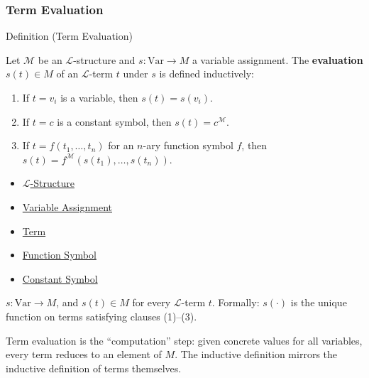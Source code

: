 
\subsubsection*{Term Evaluation}

\begin{definitionbox}{Definition (Term Evaluation)}
\begin{definition}\label{def:term-evaluation}
Let $\mathcal{M}$ be an $\mathcal{L}$-structure and $s : \mathrm{Var} \to M$
a variable assignment.
The \textbf{evaluation} $s(t) \in M$ of an $\mathcal{L}$-term $t$ under
$s$ is defined inductively:
\begin{enumerate}
  \item If $t = v_i$ is a variable, then $s(t) = s(v_i)$.
  \item If $t = c$ is a constant symbol, then $s(t) = c^{\mathcal{M}}$.
  \item If $t = f(t_1, \ldots, t_n)$ for an $n$-ary function symbol $f$,
        then $s(t) = f^{\mathcal{M}}(s(t_1), \ldots, s(t_n))$.
\end{enumerate}
\end{definition}
\end{definitionbox}

\begin{dependencies}
\begin{itemize}
  \item \hyperref[def:l-structure]{$\mathcal{L}$-Structure}
  \item \hyperref[def:variable-assignment]{Variable Assignment}
  \item \hyperref[def:term]{Term}
  \item \hyperref[def:function-symbol]{Function Symbol}
  \item \hyperref[def:constant-symbol]{Constant Symbol}
\end{itemize}
\end{dependencies}

\begin{remark*}
$s : \mathrm{Var} \to M$, and $s(t) \in M$ for every $\mathcal{L}$-term $t$.
Formally: $s(\cdot)$ is the unique function on terms satisfying clauses (1)--(3).
\end{remark*}

\begin{remark*}[Intuition]
Term evaluation is the ``computation'' step: given concrete values for
all variables, every term reduces to an element of $M$. The inductive
definition mirrors the inductive definition of terms themselves.
\end{remark*}

